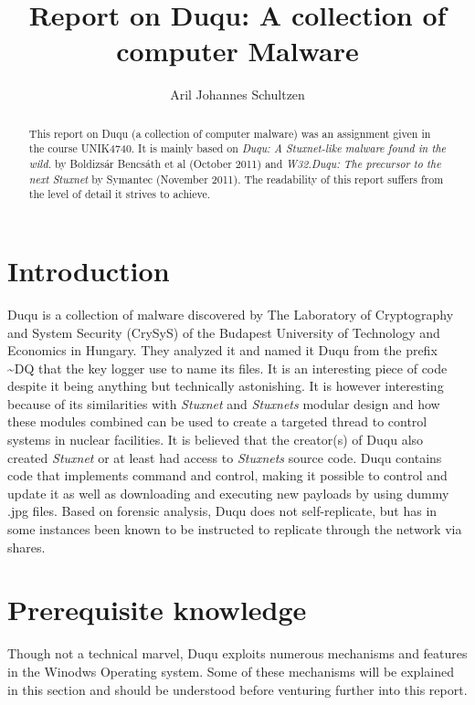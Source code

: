 \documentclass[11pt,english,a4paper]{report}
\title{Report on Duqu: A collection of computer Malware}
\author{Aril Johannes Schultzen}
\begin{document}
\maketitle
\thispagestyle{empty}
\setcounter{page}{0}
\tableofcontents
\thispagestyle{empty}
\setcounter{page}{0}
\thispagestyle{empty}
\setcounter{page}{0}
\clearpage
\setcounter{page}{1}

\begin{abstract}
This report on Duqu (a collection of computer malware) was an assignment given in the course UNIK4740. It is mainly based on \textit{Duqu: A Stuxnet-like malware found in the wild.}\cite{DUQU_BUD} by Boldizsár Bencsáth et al (October 2011) and \textit{W32.Duqu: The precursor to the next Stuxnet}\cite{DUQU_SYMANTEC} by Symantec (November 2011). The readability of this report suffers from the level of detail it strives to achieve.
\end{abstract}
\newpage

\chapter{Introduction}
Duqu is a collection of malware discovered by The Laboratory of Cryptography and System Security (CrySyS) of the Budapest University of Technology and Economics in Hungary. They analyzed it and named it Duqu from the prefix \textasciitilde DQ that the key logger use to name its files. It is an interesting piece of code despite it being anything but technically astonishing. It is however interesting because of its similarities with \textit{Stuxnet} and \textit{Stuxnets} modular design and how these modules combined can be used to create a targeted thread to control systems in nuclear facilities. It is believed that the creator(s) of Duqu also created \textit{Stuxnet} or at least had access to \textit{Stuxnets} source code. Duqu contains code that implements command and control, making it possible to control and update it as well as downloading and executing new payloads by using dummy .jpg files. Based on forensic analysis, Duqu does not self-replicate, but has in some instances been known to be instructed to replicate through the network via shares. \cite{DUQU_SYMANTEC}

\chapter{Prerequisite knowledge}
Though not a technical marvel, Duqu exploits numerous mechanisms and features in the Winodws Operating system. Some of these mechanisms will be explained in this section and should be understood before venturing further into this report.
\end{document}
